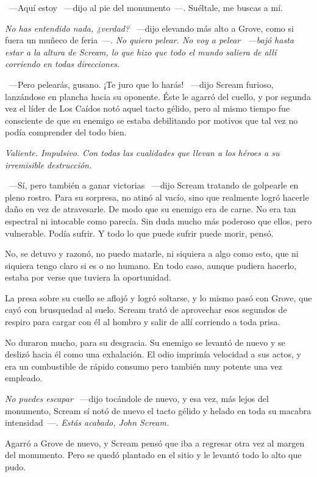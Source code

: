 ~---Aquí estoy ~---dijo al pie del monumento~---. Suéltale, me buscas a mí.

\emph{No has entendido nada, ¿verdad?} ~---dijo elevando más alto a Grove, como si fuera un muñeco de feria~---. \emph{No quiero pelear. No voy a pelear ~---bajó hasta estar a la altura de Scream, lo que hizo que todo el mundo saliera de allí corriendo en todas direcciones.}

~---Pero pelearás, gusano. ¡Te juro que lo harás! ~---dijo Scream furioso, lanzándose en plancha hacia su oponente. Éste le agarró del cuello, y por segunda vez el líder de Los Caídos notó aquel tacto gélido, pero al mismo tiempo fue consciente de que su enemigo se estaba debilitando por motivos que tal vez no podía comprender del todo bien.

\emph{Valiente. Impulsivo. Con todas las cualidades que llevan a los héroes a su irremisible destrucción.}

~---Sí, pero también a ganar victorias ~---dijo Scream tratando de golpearle en pleno rostro. Para su sorpresa, no atinó al vacío, sino que realmente logró hacerle daño en vez de atravesarle. De modo que su enemigo era de carne. No era tan espectral ni intocable como parecía. Sin duda mucho más poderoso que ellos, pero vulnerable. Podía sufrir. Y todo lo que puede sufrir puede morir, pensó.

No, se detuvo y razonó, no puedo matarle, ni siquiera a algo como esto, que ni siquiera tengo claro si es o no humano. En todo caso, aunque pudiera hacerlo, estaba por verse que tuviera la oportunidad.

La presa sobre su cuello se aflojó y logró soltarse, y lo mismo pasó con Grove, que cayó con brusquedad al suelo. Scream trató de aprovechar esos segundos de respiro para cargar con él al hombro y salir de allí corriendo a toda prisa.

No duraron mucho, para su desgracia. Su enemigo se levantó de nuevo y se deslizó hacia él como una exhalación. El odio imprimía velocidad a sus actos, y era un combustible de rápido consumo pero también muy potente una vez empleado.

\emph{No puedes escapar} ~---dijo tocándole de nuevo, y esa vez, más lejos del monumento, Scream sí notó de nuevo el tacto gélido y helado en toda su macabra intensidad~---. \emph{Estás acabado, John Scream.}

Agarró a Grove de nuevo, y Scream pensó que iba a regresar otra vez al margen del monumento. Pero se quedó plantado en el sitio y le levantó todo lo alto que pudo.

